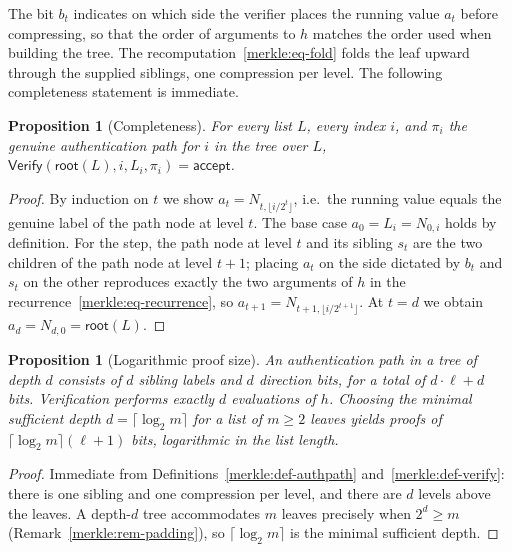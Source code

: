 \documentclass[11pt,a4paper]{article}
\newtheorem{proposition}[theorem]{Proposition}
\theoremstyle{definition}
\theoremstyle{remark}
\begin{document}
The bit \(b_t\) indicates on which side the verifier places the running value \(a_t\) before compressing, so that the order of arguments to \(h\) matches the order used when building the tree. The recomputation~\eqref{merkle:eq-fold} folds the leaf upward through the supplied siblings, one compression per level. The following completeness statement is immediate.

\begin{proposition}[Completeness]\label{merkle:prop-completeness}
For every list \(L\), every index \(i\), and \(\pi_i\) the genuine authentication path for \(i\) in the tree over \(L\), \(\mathsf{Verify}(\mathsf{root}(L), i, L_i, \pi_i) = \mathsf{accept}\).
\end{proposition}

\begin{proof}
By induction on \(t\) we show \(a_t = N_{t, \lfloor i/2^t\rfloor}\), i.e.\ the running value equals the genuine label of the path node at level \(t\). The base case \(a_0 = L_i = N_{0,i}\) holds by definition. For the step, the path node at level \(t\) and its sibling \(s_t\) are the two children of the path node at level \(t+1\); placing \(a_t\) on the side dictated by \(b_t\) and \(s_t\) on the other reproduces exactly the two arguments of \(h\) in the recurrence~\eqref{merkle:eq-recurrence}, so \(a_{t+1} = N_{t+1, \lfloor i/2^{t+1}\rfloor}\). At \(t = d\) we obtain \(a_d = N_{d,0} = \mathsf{root}(L)\).
\end{proof}

\begin{proposition}[Logarithmic proof size]\label{merkle:prop-size}
An authentication path in a tree of depth \(d\) consists of \(d\) sibling labels and \(d\) direction bits, for a total of \(d \cdot \ell + d\) bits. Verification performs exactly \(d\) evaluations of \(h\). Choosing the minimal sufficient depth \(d = \lceil \log_2 m \rceil\) for a list of \(m \ge 2\) leaves yields proofs of \(\lceil \log_2 m \rceil(\ell + 1)\) bits, logarithmic in the list length.
\end{proposition}

\begin{proof}
Immediate from Definitions~\ref{merkle:def-authpath} and~\ref{merkle:def-verify}: there is one sibling and one compression per level, and there are \(d\) levels above the leaves. A depth-\(d\) tree accommodates \(m\) leaves precisely when \(2^d \ge m\) (Remark~\ref{merkle:rem-padding}), so \(\lceil \log_2 m\rceil\) is the minimal sufficient depth.
\end{proof}
\end{document}
